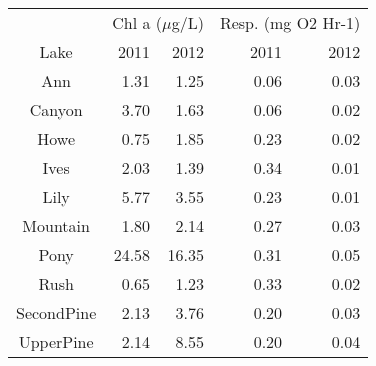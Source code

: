 \begin{table}[ht]
\centering
\begin{tabular}{crrrr}
  \hline
  & \multicolumn{2}{c}{Chl a ($\mu$g/L)} & 
                      \multicolumn{2}{c}{Resp. (mg O2 Hr-1)} \\
 Lake & 2011 & 2012 & 2011 & 2012 \\
 \hline
Ann & 1.31 & 1.25 & 0.06 & 0.03 \\ 
  Canyon & 3.70 & 1.63 & 0.06 & 0.02 \\ 
  Howe & 0.75 & 1.85 & 0.23 & 0.02 \\ 
  Ives & 2.03 & 1.39 & 0.34 & 0.01 \\ 
  Lily & 5.77 & 3.55 & 0.23 & 0.01 \\ 
  Mountain & 1.80 & 2.14 & 0.27 & 0.03 \\ 
  Pony & 24.58 & 16.35 & 0.31 & 0.05 \\ 
  Rush & 0.65 & 1.23 & 0.33 & 0.02 \\ 
  SecondPine & 2.13 & 3.76 & 0.20 & 0.03 \\ 
  UpperPine & 2.14 & 8.55 & 0.20 & 0.04 \\ 
   \hline
\end{tabular}
\end{table}
